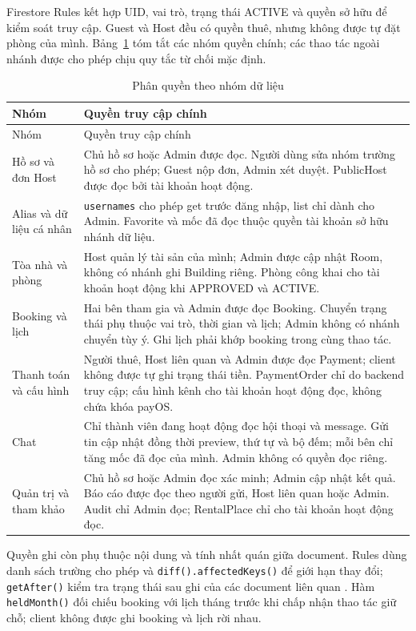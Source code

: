 Firestore Rules kết hợp UID, vai trò, trạng thái ACTIVE và quyền sở hữu để kiểm soát truy cập. Guest và Host đều có quyền thuê, nhưng không được tự đặt phòng của mình. Bảng~\ref{tab:ch4-permissions} tóm tắt các nhóm quyền chính; các thao tác ngoài nhánh được cho phép chịu quy tắc từ chối mặc định.

\begingroup\small{}
\begin{longtable}{@{}>{\raggedright\arraybackslash}p{4.1cm}>{\raggedright\arraybackslash}p{11.15cm}@{}}
\caption{Phân quyền theo nhóm dữ liệu}\label{tab:ch4-permissions}\\
\toprule Nhóm & Quyền truy cập chính \\ \midrule\endfirsthead
\toprule Nhóm & Quyền truy cập chính \\ \midrule\endhead
\bottomrule\endlastfoot
Hồ sơ và đơn Host & Chủ hồ sơ hoặc Admin được đọc. Người dùng sửa nhóm trường hồ sơ cho phép; Guest nộp đơn, Admin xét duyệt. PublicHost được đọc bởi tài khoản hoạt động. \\
Alias và dữ liệu cá nhân & \texttt{usernames} cho phép get trước đăng nhập, list chỉ dành cho Admin. Favorite và mốc đã đọc thuộc quyền tài khoản sở hữu nhánh dữ liệu. \\
Tòa nhà và phòng & Host quản lý tài sản của mình; Admin được cập nhật Room, không có nhánh ghi Building riêng. Phòng công khai cho tài khoản hoạt động khi APPROVED và ACTIVE. \\
Booking và lịch & Hai bên tham gia và Admin được đọc Booking. Chuyển trạng thái phụ thuộc vai trò, thời gian và lịch; Admin không có nhánh chuyển tùy ý. Ghi lịch phải khớp booking trong cùng thao tác. \\
Thanh toán và cấu hình & Người thuê, Host liên quan và Admin được đọc Payment; client không được tự ghi trạng thái tiền. PaymentOrder chỉ do backend truy cập; cấu hình kênh cho tài khoản hoạt động đọc, không chứa khóa payOS.  \\
Chat & Chỉ thành viên đang hoạt động đọc hội thoại và message. Gửi tin cập nhật đồng thời preview, thứ tự và bộ đếm; mỗi bên chỉ tăng mốc đã đọc của mình. Admin không có quyền đọc riêng. \\
Quản trị và tham khảo & Chủ hồ sơ hoặc Admin đọc xác minh; Admin cập nhật kết quả. Báo cáo được đọc theo người gửi, Host liên quan hoặc Admin. Audit chỉ Admin đọc; RentalPlace chỉ cho tài khoản hoạt động đọc. \\
\end{longtable}\endgroup

Quyền ghi còn phụ thuộc nội dung và tính nhất quán giữa document. Rules dùng danh sách trường cho phép và \texttt{diff().\allowbreak{}affected\allowbreak{}Keys()} để giới hạn thay đổi; \texttt{get\allowbreak{}After()} kiểm tra trạng thái sau ghi của các document liên quan \parencite{firebase_rules_fields,firebase_rules_conditions}. Hàm \texttt{held\allowbreak{}Month()} đối chiếu booking với lịch tháng trước khi chấp nhận thao tác giữ chỗ; client không được ghi booking và lịch rời nhau.

